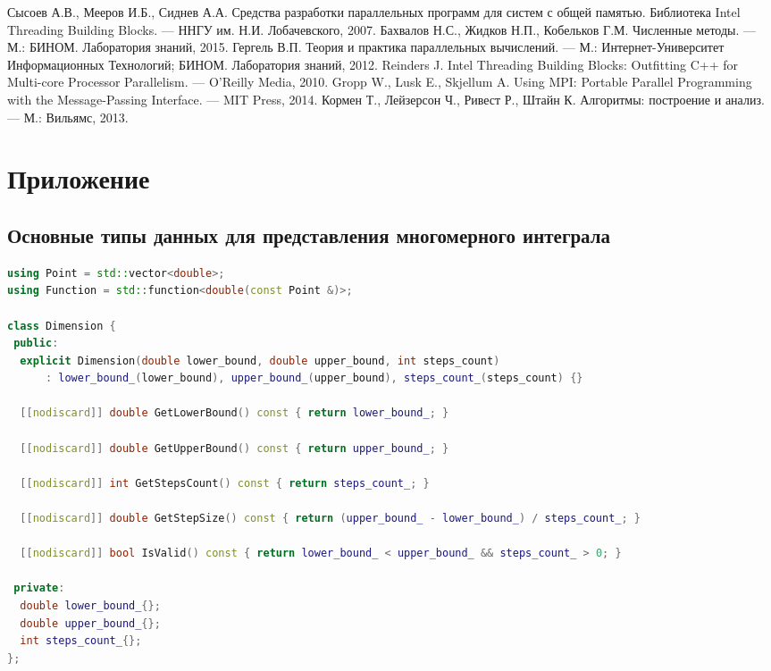 \documentclass[a4paper,12pt]{article}
\begin{document}
  \begin{thebibliography}{99}
     Сысоев А.В., Мееров И.Б., Сиднев А.А. Средства разработки параллельных программ для систем с общей памятью. Библиотека Intel Threading Building Blocks. — ННГУ им. Н.И. Лобачевского, 2007.
     Бахвалов Н.С., Жидков Н.П., Кобельков Г.М. Численные методы. — М.: БИНОМ. Лаборатория знаний, 2015.
     Гергель В.П. Теория и практика параллельных вычислений. — М.: Интернет-Университет Информационных Технологий; БИНОМ. Лаборатория знаний, 2012.
     Reinders J. Intel Threading Building Blocks: Outfitting C++ for Multi-core Processor Parallelism. — O'Reilly Media, 2010.
     Gropp W., Lusk E., Skjellum A. Using MPI: Portable Parallel Programming with the Message-Passing Interface. — MIT Press, 2014.
     Кормен Т., Лейзерсон Ч., Ривест Р., Штайн К. Алгоритмы: построение и анализ. — М.: Вильямс, 2013.
  \end{thebibliography}

  \newpage

  \appendix


  \section{Приложение}\label{sec:appendix}

  \subsection{Основные типы данных для представления многомерного интеграла}\label{subsec:types}

  \begin{lstlisting}[language=C++,label={lst:types}]
using Point = std::vector<double>;
using Function = std::function<double(const Point &)>;

class Dimension {
 public:
  explicit Dimension(double lower_bound, double upper_bound, int steps_count)
      : lower_bound_(lower_bound), upper_bound_(upper_bound), steps_count_(steps_count) {}

  [[nodiscard]] double GetLowerBound() const { return lower_bound_; }

  [[nodiscard]] double GetUpperBound() const { return upper_bound_; }

  [[nodiscard]] int GetStepsCount() const { return steps_count_; }

  [[nodiscard]] double GetStepSize() const { return (upper_bound_ - lower_bound_) / steps_count_; }

  [[nodiscard]] bool IsValid() const { return lower_bound_ < upper_bound_ && steps_count_ > 0; }

 private:
  double lower_bound_{};
  double upper_bound_{};
  int steps_count_{};
};
  \end{lstlisting}
\end{document}
